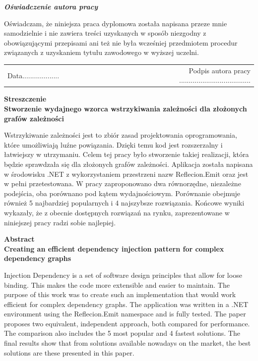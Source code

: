 \documentclass[12pt]{article}
\begin{document}
\vspace{150pt}

\begin{center}
\textbf{\emph{Oświadczenie autora pracy}}\\
\end{center}
Oświadczam, że niniejsza praca dyplomowa została napisana przeze mnie samodzielnie i nie zawiera treści uzyskanych w sposób niezgodny z obowiązującymi przepisami ani też nie była wcześniej przedmiotem procedur związanych z uzyskaniem tytułu zawodowego w wyższej uczelni.\\

\vspace{54pt}

\begin{tabular}{lccccccccr}
Data................... & & & & & & & & & Podpis autora pracy ..................................... \\
\end{tabular}


\clearpage
\begin{center}
\textbf{Streszczenie}\\
\vspace{16pt}
\textbf{Stworzenie wydajnego wzorca wstrzykiwania zależności dla złożonych grafów zależności}
\end{center}
Wstrzykiwanie zależności jest to zbiór zasad projektowania oprogramowania, które umożliwiają luźne powiązania. Dzięki temu kod jest rozszerzalny i łatwiejszy w utrzymaniu. Celem tej pracy było stworzenie takiej realizacji, która będzie sprawdzała się dla złożonych grafów zależności. Aplikacja została napisana w środowisku .NET z wykorzystaniem przestrzeni nazw Reflecion.Emit oraz jest w pełni przetestowana. W pracy zaproponowano dwa równorzędne, niezależne podejścia, oba porównano pod kątem wydajnościowym. Porównanie obejmuje również 5 najbardziej popularnych i 4 najszybsze rozwiązania. Końcowe wyniki wykazały, że z obecnie dostępnych rozwiązań na rynku, zaprezentowane w niniejszej pracy radzi sobie najlepiej.

\clearpage
\begin{center}
\textbf{Abstract}\\
\vspace{16pt}
\textbf{Creating an efficient dependency injection pattern for complex dependency graphs}
\end{center}
Injection Dependency is a set of software design principles that allow for loose binding. This makes the code more extensible and easier to maintain. The purpose of this work was to create such an implementation that would work efficient for complex dependency graphs. The application was written in a .NET environment using the Reflecion.Emit namespace and is fully tested. The paper proposes two equivalent, independent approach, both compared for performance. The comparison also includes the 5 most popular and 4 fastest solutions. The final results show that from solutions available nowadays on the market, the best solutions are these presented in this paper.
\end{document}
